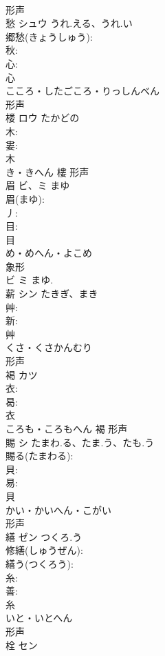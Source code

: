 \documentclass[8pt]{extreport}
\begin{document}
\begin{CJK}{UTF8}{min}
\\	形声 
\\	愁	シュウ	うれ.える、うれ.い		
\\	郷愁(きょうしゅう): 
\\	秋: 
\\	心: 
\\	心	
\\	こころ・したごころ・りっしんべん	
\\	形声 
\\	楼	ロウ	たかどの		
\\	木: 
\\	婁: 
\\	木	
\\	き・きへん	樓	形声 
\\	眉	ビ、ミ	まゆ		
\\	眉(まゆ): 
\\	丿: 
\\	目: 
\\	目	
\\	め・めへん・よこめ	
\\	象形 
\\	ビ ミ まゆ.
\\	薪	シン	たきぎ、まき		
\\	艸: 
\\	新: 
\\	艸	
\\	くさ・くさかんむり	
\\	形声 
\\	褐	カツ			
\\	衣: 
\\	曷: 
\\	衣	
\\	ころも・ころもへん	褐	形声 
\\	賜	シ	たまわ.る、たま.う、たも.う		
\\	賜る(たまわる): 
\\	貝: 
\\	易: 
\\	貝	
\\	かい・かいへん・こがい	
\\	形声 
\\	繕	ゼン	つくろ.う		
\\	修繕(しゅうぜん): 
\\	繕う(つくろう): 
\\	糸: 
\\	善: 
\\	糸	
\\	いと・いとへん	
\\	形声 
\\	栓	セン			

\end{CJK}
\end{document}
